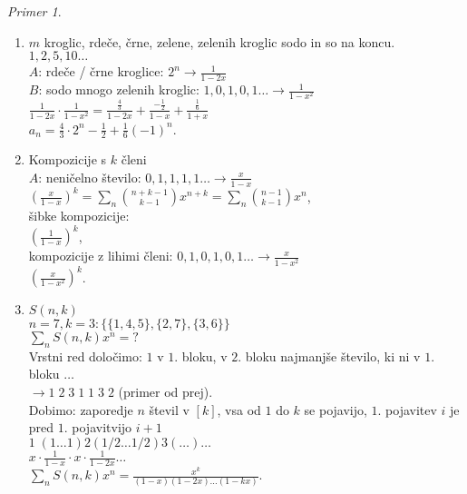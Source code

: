 \documentclass[a4paper, 12pt]{book}
\theoremstyle{definition}
\theoremstyle{remark}
\newtheorem*{ex}{Primer}
\begin{document}
\begin{ex} \text{} \\
  \begin{enumerate}[label=(\arabic*)]
    \item $m$ kroglic, rdeče, črne, zelene, zelenih kroglic sodo in so na koncu. \\
      $1, 2, 5, 10 \dots$ \\
      $A$: rdeče / črne kroglice: $2^n \to \frac{1}{1-2x}$ \\
      $B$: sodo mnogo zelenih kroglic: $1, 0, 1, 0, 1 \dots \to \frac{1}{1-x^2}$ \\
      $\frac{1}{1-2x} \cdot \frac{1}{1-x^2} = \frac{\frac{4}{3}}{1-2x} + \frac{-\frac{1}{2}}{1-x} + \frac{\frac{1}{6}}{1+x}$ \\
      $a_n = \frac{4}{3} \cdot 2^n - \frac{1}{2} + \frac{1}{6} (-1)^n$.
    \item Kompozicije s $k$ členi \\
      $A$: neničelno število: $0, 1, 1, 1, 1 \dots \to \frac{x}{1-x}$ \\
      $\left(\frac{x}{1-x}\right)^k = \sum_n \binom{n+k-1}{k-1} x^{n+k} = \sum_n \binom{n-1}{k-1} x^n$, \\
      šibke kompozicije: \\
      $\left(\frac{1}{1-x}\right)^k$, \\
      kompozicije z lihimi členi: $0, 1, 0, 1, 0, 1 \dots \to \frac{x}{1-x^2}$ \\
      $\left(\frac{x}{1-x^2}\right)^k$.
    \item $S(n,k)$ \\
      $n=7, k=3: \{\{1, 4, 5\}, \{2, 7\}, \{3, 6\}\}$ \\
      $\sum_n S(n,k) x^n = ?$ \\
      Vrstni red določimo: $1$ v $1.$ bloku, v $2.$ bloku najmanjše število, ki ni v $1.$ bloku $\dots$ \\
      $\to 1 \; 2 \; 3 \; 1 \; 1 \; 3 \; 2$ (primer od prej). \\
      Dobimo: zaporedje $n$ števil v $[k]$, vsa od $1$ do $k$ se pojavijo, $1.$ pojavitev $i$ je pred $1.$ pojavitvijo $i+1$ \\
      $1 \; (1 \dots 1) 2 (1/2 \dots 1/2) 3 (\dots) \dots$ \\
      $x \cdot \frac{1}{1-x} \cdot x \cdot \frac{1}{1-2x} \dots$ \\
      $\sum_n S(n,k) x^n = \frac{x^k}{(1-x) (1-2x) \dots (1-kx)}$. \\

\end{enumerate}
\end{ex}
\end{document}
